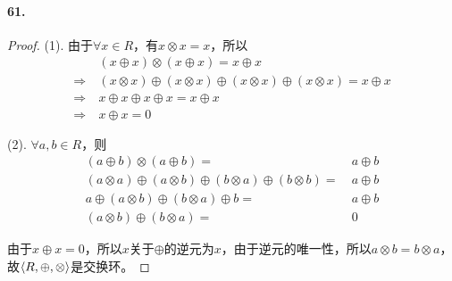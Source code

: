 \documentclass[12pt, a4paper, oneside]{ctexart}
\begin{document}
\paragraph{61.}\begin{proof}
    (1). 由于$\forall x\in R$，有$x\otimes x = x$，所以
    \begin{equation*}
        \begin{aligned}
            &(x\oplus x)\otimes (x\oplus x) = x\oplus x\\
            \Rightarrow\ &(x\otimes x)\oplus(x\otimes x)\oplus(x\otimes x)\oplus(x\otimes x)=x\oplus x\\
            \Rightarrow\ &x\oplus x\oplus x\oplus x=x\oplus x\\
            \Rightarrow\ &x\oplus x = 0
        \end{aligned}
    \end{equation*}
    
    (2). $\forall a, b\in R$，则
    \begin{equation*}
        \begin{aligned}
            (a\oplus b)\otimes(a\oplus b)=\ &a\oplus b\\
            (a\otimes a)\oplus (a\otimes b) \oplus (b\otimes a)\oplus (b\otimes b) = \ &a\oplus b\\
            a\oplus (a\otimes b) \oplus (b\otimes a)\oplus b = \ &a\oplus b\\
            (a\otimes b) \oplus (b\otimes a)=\ &0
        \end{aligned}
    \end{equation*}

    由于$x\oplus x=0$，所以$x$关于$\oplus$的逆元为$x$，由于逆元的唯一性，所以$a\otimes b = b\otimes a$，故$\braket{R,\oplus,\otimes}$是交换环。
\end{proof}
\end{document}
